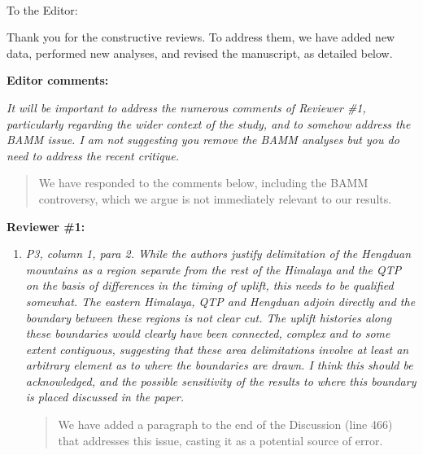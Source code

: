 \documentclass[11pt]{letter}
\begin{document}
\raggedright{}


\begin{letter}{ \\

}
\address{Integrative Research Center\\
  The Field Museum\\
  1400 South Lake Shore Drive\\
  Chicago, IL  60605-2496\\
  USA}

\opening{To the Editor:}

Thank you for the constructive reviews. To address them, we have added
new data, performed new analyses, and revised the manuscript, as
detailed below.

\textbf{Editor comments:}

\textit{It will be important to address the numerous comments of
  Reviewer \#1, particularly regarding the wider context of the study,
  and to somehow address the BAMM issue. I am not suggesting you
  remove the BAMM analyses but you do need to address the recent
  critique.}

\begin{quote}
  We have responded to the comments below, including the BAMM
  controversy, which we argue is not immediately relevant to our
  results.
\end{quote}

\textbf{Reviewer \#1:}

\begin{enumerate}
\item \textit{P3, column 1, para 2. While the authors justify
    delimitation of the Hengduan mountains as a region separate from
    the rest of the Himalaya and the QTP on the basis of differences
    in the timing of uplift, this needs to be qualified somewhat. The
    eastern Himalaya, QTP and Hengduan adjoin directly and the
    boundary between these regions is not clear cut. The uplift
    histories along these boundaries would clearly have been
    connected, complex and to some extent contiguous, suggesting that
    these area delimitations involve at least an arbitrary element as
    to where the boundaries are drawn. I think this should be
    acknowledged, and the possible sensitivity of the results to where
    this boundary is placed discussed in the paper.}

\begin{quote}
  We have added a paragraph to the end of the Discussion (line 466)
  that addresses this issue, casting it as a potential source of
  error.
\end{quote}


\end{enumerate}
\end{letter}
\end{document}
